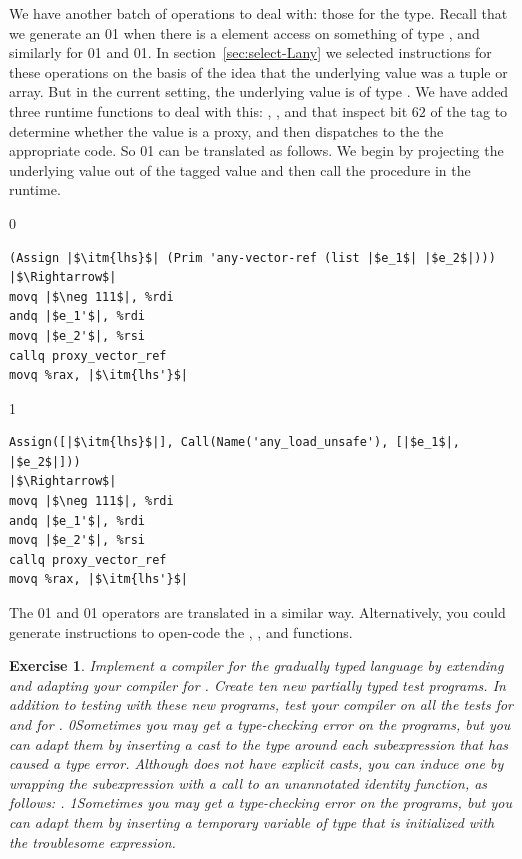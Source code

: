 \documentclass[7x10]{TimesAPriori_MIT}%
\def\racketEd{0}
\def\pythonEd{1}
\providecommand{\BookEdition}{1}
\let\edition\BookEdition
\newcommand{\racket}[1]{{\if\edition\racketEd{#1}\fi}}
\newcommand{\pythonColor}[0]{}
\newcommand{\python}[1]{{\if\edition\pythonEd\pythonColor #1\fi}}
\newtheorem{exercise}[theorem]{Exercise}
\numberwithin{theorem}{chapter}
\numberwithin{definition}{chapter}
\numberwithin{equation}{chapter}
\begin{document}
We have another batch of operations to deal with: those for the
\CANYTY{} type. Recall that we generate an
\racket{}\python{} when
there is a element access on something of type \CANYTY{}, and
similarly for
\racket{}\python{} and
\racket{}\python{}. In
section~\ref{sec:select-Lany} we selected instructions for these
operations on the basis of the idea that the underlying value was a tuple or
array. But in the current setting, the underlying value is of type
\PTUPLETYNAME{}\python{ or \PARRAYTYNAME{}}.  We have added three runtime
functions to deal with this:
,
, and
 that inspect bit $62$ of the tag
to determine whether the value is a proxy, and then
dispatches to the the appropriate code.
%
So \racket{}\python{}
can be translated as follows.
We begin by projecting the underlying value out of the tagged value and
then call the  procedure in the runtime.
{\if\edition\racketEd
\begin{lstlisting}
(Assign |$\itm{lhs}$| (Prim 'any-vector-ref (list |$e_1$| |$e_2$|)))
|$\Rightarrow$|
movq |$\neg 111$|, %rdi
andq |$e_1'$|, %rdi
movq |$e_2'$|, %rsi
callq proxy_vector_ref
movq %rax, |$\itm{lhs'}$|
\end{lstlisting}
\fi}
{\if\edition\pythonEd\pythonColor
\begin{lstlisting}
Assign([|$\itm{lhs}$|], Call(Name('any_load_unsafe'), [|$e_1$|, |$e_2$|]))
|$\Rightarrow$|
movq |$\neg 111$|, %rdi
andq |$e_1'$|, %rdi
movq |$e_2'$|, %rsi
callq proxy_vector_ref
movq %rax, |$\itm{lhs'}$|
\end{lstlisting}
\fi}
\noindent The \racket{}\python{}
and \racket{}\python{} operators 
are translated in a similar way. Alternatively, you could generate
instructions to open-code
the , ,
and  functions.

\begin{exercise}\normalfont\normalsize
  Implement a compiler for the gradually typed \LangGrad{} language by
  extending and adapting your compiler for \LangLam{}. Create ten new
  partially typed test programs. In addition to testing with these
  new programs, test your compiler on all the tests for \LangLam{}
  and for \LangDyn{}.
%
  \racket{Sometimes you may get a type-checking error on the
    \LangDyn{} programs, but you can adapt them by inserting a cast to
    the \CANYTY{} type around each subexpression that has caused a type
    error. Although \LangDyn{} does not have explicit casts, you can
    induce one by wrapping the subexpression \code{e} with a call to
    an unannotated identity function, as follows: \code{((lambda (x) x) e)}.}
%
  \python{Sometimes you may get a type-checking error on the
    \LangDyn{} programs, but you can adapt them by inserting a
    temporary variable of type \CANYTY{} that is initialized with the
    troublesome expression.}
\end{exercise}
\end{document}
